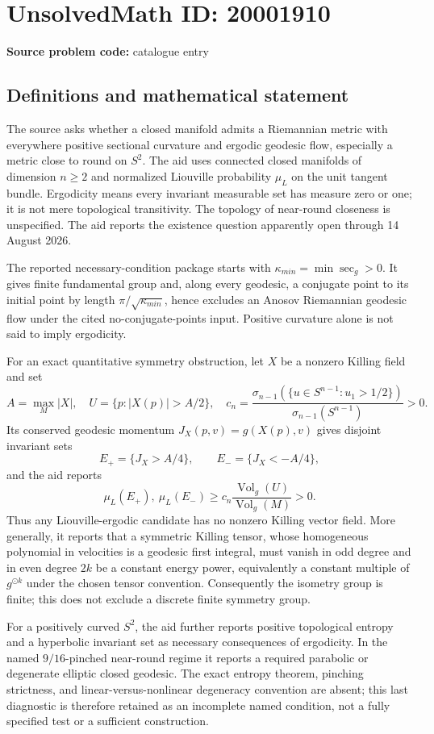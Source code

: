 \documentclass[11pt]{article}
\begin{document}
\section*{UnsolvedMath ID: 20001910}
\textbf{Source problem code:} catalogue entry
\subsection{Definitions and mathematical statement}
The source asks whether a closed manifold admits a Riemannian metric with everywhere positive sectional curvature and ergodic geodesic flow, especially a metric close to round on \(S^2\). The aid uses connected closed manifolds of dimension \(n\ge2\) and normalized Liouville probability \(\mu_L\) on the unit tangent bundle. Ergodicity means every invariant measurable set has measure zero or one; it is not mere topological transitivity. The topology of near-round closeness is unspecified. The aid reports the existence question apparently open through 14 August 2026.

The reported necessary-condition package starts with \(\kappa_{min}=\min\sec_g>0\). It gives finite fundamental group and, along every geodesic, a conjugate point to its initial point by length \(\pi/\sqrt{\kappa_{min}}\), hence excludes an Anosov Riemannian geodesic flow under the cited no-conjugate-points input. Positive curvature alone is not said to imply ergodicity.

For an exact quantitative symmetry obstruction, let \(X\) be a nonzero Killing field and set
\[
 A=\max_M|X|,\quad U=\{p:|X(p)|>A/2\},\quad
 c_n=\frac{\sigma_{n-1}(\{u\in S^{n-1}:u_1>1/2\})}
             {\sigma_{n-1}(S^{n-1})}>0.
\]
Its conserved geodesic momentum \(J_X(p,v)=g(X(p),v)\) gives disjoint invariant sets
\[
 E_+=\{J_X>A/4\},\qquad E_-=\{J_X<-A/4\},
\]
and the aid reports
\[
 \mu_L(E_+),\ \mu_L(E_-)
 \ge c_n\frac{\operatorname{Vol}_g(U)}{\operatorname{Vol}_g(M)}>0.
\]
Thus any Liouville-ergodic candidate has no nonzero Killing vector field. More generally, it reports that a symmetric Killing tensor, whose homogeneous polynomial in velocities is a geodesic first integral, must vanish in odd degree and in even degree \(2k\) be a constant energy power, equivalently a constant multiple of \(g^{\odot k}\) under the chosen tensor convention. Consequently the isometry group is finite; this does not exclude a discrete finite symmetry group.

For a positively curved \(S^2\), the aid further reports positive topological entropy and a hyperbolic invariant set as necessary consequences of ergodicity. In the named \(9/16\)-pinched near-round regime it reports a required parabolic or degenerate elliptic closed geodesic. The exact entropy theorem, pinching strictness, and linear-versus-nonlinear degeneracy convention are absent; this last diagnostic is therefore retained as an incomplete named condition, not a fully specified test or a sufficient construction.
\end{document}
